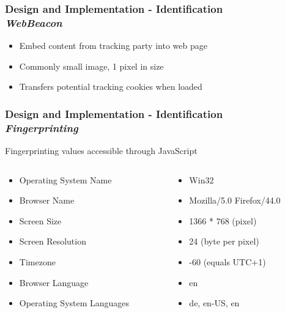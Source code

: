 \documentclass[accentcolor=tud9c,colorbacktitle,xcolor=dvipsnames]{tudbeamer}
\begin{document}
\begin{frame}
    \frametitle{Design and Implementation - Identification \\ \textit{WebBeacon}}
    \begin{block}{}
        \begin{itemize}
            \item Embed content from tracking party into web page
            \item Commonly small image, 1 pixel in size
            \item Transfers potential tracking cookies when loaded
        \end{itemize}
    \end{block}
\end{frame}

\begin{frame}
    \frametitle{Design and Implementation - Identification \\ \textit{Fingerprinting}}
    \begin{block}{Fingerprinting values accessible through JavaScript}
        \begin{columns}[T]
            \begin{column}[T]{6cm}
                \begin{itemize}
                    \item Operating System Name
                    \item Browser Name
                    \item Screen Size
                    \item Screen Resolution
                    \item Timezone
                    \item Browser Language
                    \item Operating System Languages
                \end{itemize}
            \end{column}
            \begin{column}[T]{7cm}
                \begin{itemize}
                    \item[] Win32
                    \item[] Mozilla/5.0 Firefox/44.0
                    \item[] 1366 * 768 (pixel)
                    \item[] 24 (byte per pixel)
                    \item[] -60 (equals UTC+1)
                    \item[] en
                    \item[] de, en-US, en
                \end{itemize}
            \end{column}
        \end{columns}
    \end{block}
\end{frame}
\end{document}
